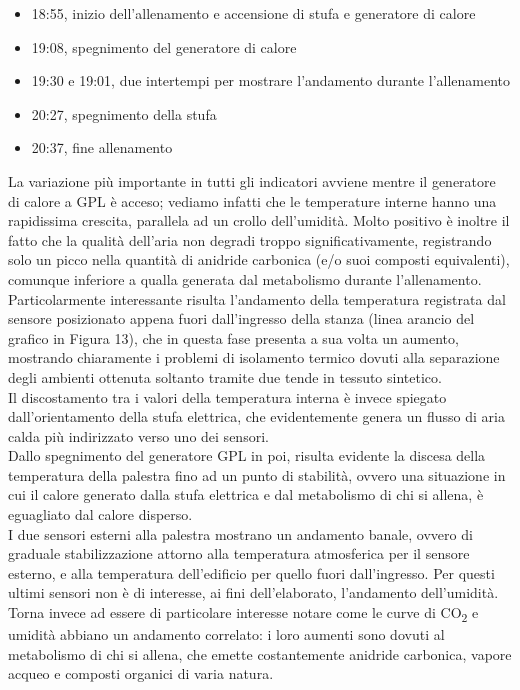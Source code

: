 \documentclass[fleqn,10pt]{SelfArx} %
\begin{document}
\begin{itemize}[noitemsep] %
	\item 18:55, inizio dell'allenamento e accensione di stufa e generatore di calore
	\item 19:08, spegnimento del generatore di calore 
	\item 19:30 e 19:01, due intertempi per mostrare l'andamento durante l'allenamento
	\item 20:27, spegnimento della stufa
	\item 20:37, fine allenamento
\end{itemize}

La variazione più importante in tutti gli indicatori avviene mentre il generatore di calore a GPL è 
acceso; vediamo infatti che le temperature interne hanno una rapidissima crescita, parallela ad un 
crollo dell'umidità. Molto positivo è inoltre il fatto che la qualità dell'aria non degradi troppo 
significativamente, registrando solo un picco nella quantità di anidride carbonica (e/o suoi composti 
equivalenti), comunque inferiore a qualla generata dal metabolismo durante l'allenamento.\\
Particolarmente interessante risulta l'andamento della temperatura registrata dal sensore posizionato 
appena fuori dall'ingresso della stanza (linea arancio del grafico in Figura 13), che in questa fase 
presenta a sua volta un aumento, mostrando chiaramente i problemi di isolamento
termico dovuti alla separazione degli ambienti ottenuta soltanto tramite due tende in tessuto sintetico.\\
Il discostamento tra i valori della temperatura interna è invece spiegato dall'orientamento della stufa 
elettrica, che evidentemente genera un flusso di aria calda più indirizzato verso uno dei sensori.\\

Dallo spegnimento del generatore GPL in poi, risulta evidente la discesa della temperatura della 
palestra fino ad un punto di stabilità, ovvero una situazione in cui il calore generato dalla stufa 
elettrica e dal metabolismo di chi si allena, è eguagliato dal calore disperso.\\
I due sensori esterni alla palestra mostrano un andamento banale, ovvero di graduale stabilizzazione 
attorno alla temperatura atmosferica per il sensore esterno, e alla temperatura dell'edificio per quello 
fuori dall'ingresso. Per questi ultimi sensori non è di interesse, ai fini dell'elaborato, l'andamento 
dell'umidità.
\\
Torna invece ad essere di particolare interesse notare come le curve di CO\textsubscript{2} e 
umidità abbiano un andamento correlato: i loro aumenti sono dovuti al metabolismo di chi si allena, 
che emette costantemente anidride carbonica, vapore acqueo e composti organici di varia natura.\\
\end{document}
